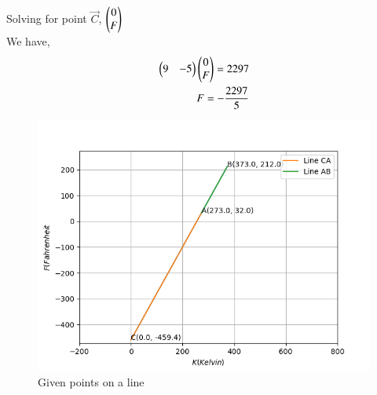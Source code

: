 \documentclass[journal]{IEEEtran}
\begin{document}
Solving for point $\vec{C}$, $\begin{pmatrix}0 \\ F\end{pmatrix}$\\
We have,
\begin{align}
    \begin{pmatrix}9 & -5\end{pmatrix}\begin{pmatrix}0 \\ F\end{pmatrix} = 2297\\
    F = -\frac{2297}{5}
\end{align}

\begin{figure}[H]
   \centering
  \includegraphics[width=0.64\columnwidth]{figs/fig.png}
   \caption{Given points on a line}
   \label{stemplot}
\end{figure}
\end{document}
